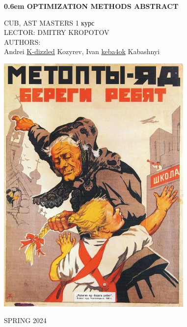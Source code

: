 \documentclass[12pt,letterpaper]{report}
\theoremstyle{definition}
\begin{document}
\clearpage
\newcommand\nbvspace[1][3]{\vspace*{\stretch{#1}}}
\newcommand\nbstretchyspace{\spaceskip0.5em plus 0.25em minus 0.25em}
\newcommand{\nbtitlestretch}{\spaceskip0.6em}
\pagestyle{empty}
\begin{center}
\bfseries
\nbvspace[1]
\Huge
{\nbtitlestretch\huge
OPTIMIZATION METHODS ABSTRACT}

\nbvspace[1]
\normalsize

CUB, AST MASTERS 1 курс\\
LECTOR: DMITRY KROPOTOV
\nbvspace[1]
\\
\Large AUTHORS:\\[0.5em]
\footnotesize
Andrei \href{https://github.com/K-dizzled}{K-dizzled} Kozyrev,
Ivan \href{https://github.com/keba4ok}{keba4ok} Kabashnyi

\nbvspace[2]

\includegraphics[width=3.8in]{./images/metopti_logo.png}
\nbvspace[3]
\normalsize

\large
SPRING 2024
\nbvspace[1]
\end{center}
\newpage
\pagestyle{plain}
\fi
\end{document}
